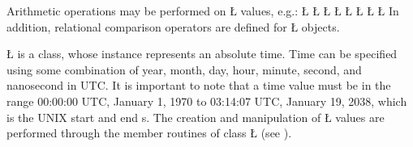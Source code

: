 \documentclass[openright,twoside]{report}
\begin{document}
Arithmetic operations may be performed on \LGinlinetrue\LGbegin\lgrinde\L{}\endlgrinde\LGend{} values, e.g.:
\LGinlinefalse\LGbegin\lgrinde
\L{}
\L{}
\L{}
\CE{}\L{}
\CE{}\L{}
\CE{}\L{}
\CE{}\L{}
\CE{}\L{}
\CE{}\endlgrinde\LGend
In addition, relational comparison operators are defined for \LGinlinetrue\LGbegin\lgrinde\L{}\endlgrinde\LGend{} objects.

\LGinlinetrue\LGbegin\lgrinde\L{}\endlgrinde\LGend{} is a class, whose instance represents an absolute time.
Time can be specified using some combination of year, month, day, hour, minute, second, and nanosecond in UTC.
It is important to note that a time value must be in the range 00:00:00 UTC, January 1, 1970 to 03:14:07 UTC, January 19, 2038, which is the UNIX start and end s.
The creation and manipulation of \LGinlinetrue\LGbegin\lgrinde\L{}\endlgrinde\LGend{} values are performed through the member routines of class \LGinlinetrue\LGbegin\lgrinde\L{}\endlgrinde\LGend{} (see ).
\end{document}
